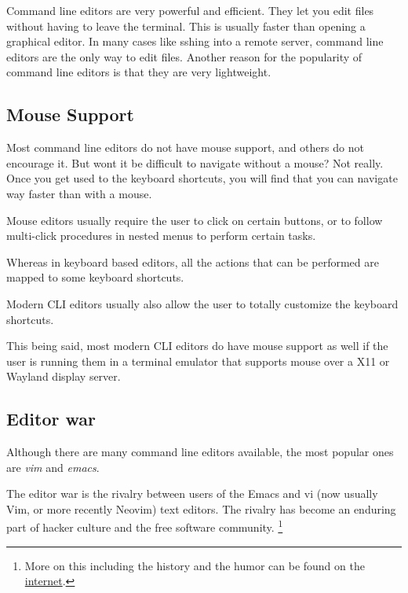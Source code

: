 Command line editors are very powerful and efficient.
They let you edit files without having to leave the terminal.
This is usually faster than opening a graphical editor.
In many cases like sshing
into a remote server, command line editors are the only way to edit files.
Another reason for the popularity of command line editors is that they are very lightweight.

\subsection{Mouse Support}
Most command line editors do not have mouse support, and others do not encourage it.
But wont it be difficult to navigate without a mouse?
Not really.
Once you get used to the keyboard shortcuts, you will find that you can navigate way faster than with a mouse.

Mouse editors usually require the user to click on certain buttons,
or to follow multi-click procedures in nested menus to perform certain tasks.

Whereas in keyboard based editors, all the actions that can be performed
are mapped to some keyboard shortcuts.

Modern CLI editors usually also allow the user to totally customize the keyboard shortcuts.

This being said, most modern CLI editors do have mouse support as well if the user is running them in a terminal emulator that supports mouse over a X11 or Wayland display server.

\subsection{Editor war}

Although there are many command line editors available, the most popular ones are \textit{vim} and \textit{emacs}.

\begin{definition}
The editor war is the rivalry between users of the Emacs and vi (now usually Vim, or more recently Neovim) text editors.
The rivalry has become an enduring part of hacker culture and the free software community.
\footnote{
  More on this including the history and the humor can be found on the
  \href{https://en.wikipedia.org/wiki/Editor\_war}{internet}.
}
\end{definition}

